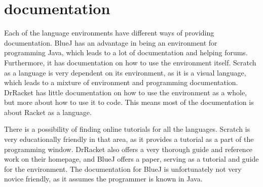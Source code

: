 \section{documentation}
\label{sec:documentation}
Each of the language environments have different ways of providing documentation. BlueJ has an advantage in being an environment for programming Java, which leads to a lot of documentation and helping forums. Furthermore, it has documentation on how to use the environment itself. Scratch as a language is very dependent on its environment, as it is a visual language, which leads to a mixture of environment and programming documentation. DrRacket has little documentation on how to use the environment as a whole, but more about how to use it to code. This means most of the documentation is about Racket as a language.

There is a possibility of finding online tutorials for all the languages. Scratch is very educationally friendly in that area, as it provides a tutorial as a part of the programming window. DrRacket also offers a very thorough guide and reference work on their homepage, and BlueJ offers a paper, serving as a tutorial and guide for the environment. The documentation for BlueJ is unfortunately not very novice friendly, as it assumes the programmer is known in Java.